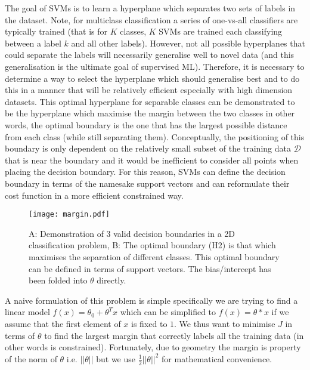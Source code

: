 The goal of SVMs is to learn a hyperplane which separates two sets of labels in the dataset. Note, for multiclass classification a series of one-vs-all
classifiers are typically trained (that is for \(K\) classes, \(K\) SVMs are trained each classifying between a label \(k\) and all other labels).
However, not all possible hyperplanes that could separate the labels will necessarily generalise well to novel data (and this generalisation
is the ultimate goal of supervised ML).  Therefore, it is necessary to determine a way to select the hyperplane which should generalise best and to do
this in a manner that will be relatively efficient especially with high dimension datasets.  This optimal hyperplane for separable classes can be demonstrated to be
the hyperplane which maximise the margin between the two classes \citep{vapnik1982estimation} in other words, the optimal boundary is the one that has the largest
possible distance from each class (while still separating them).  Conceptually, the positioning of this boundary is only dependent
on the relatively small subset of the training data \(\mathcal{D}\) that is near the boundary and it would be inefficient to consider all points when
placing the decision boundary.  For this reason, SVMs can define the decision boundary in terms of the namesake support vectors and can reformulate
their cost function in a more efficient constrained way.

\begin{figure}[h]
    \texttt{[image: margin.pdf]}
    \caption{A: Demonstration of 3 valid decision boundaries in a 2D classification problem, B: The optimal boundary (H2) is that which maximises
        the separation of different classes.  This optimal boundary can be defined in terms of support vectors.  The bias/intercept has been 
    folded into \(\theta\) directly.}
    \label{fig:margin}
\end{figure}

A naive formulation of this problem is simple specifically we are trying to find a linear model \(f(x) = \theta_{0} + \theta^{T}x\) which can be simplified 
to \(f(x) = \theta * x \) if we assume that the first element of \(x\) is fixed to \(1\). We thus want to minimise \(J\) in terms of \(\theta\) to find
the largest margin that correctly labels all the training data (in other words is constrained).  Fortunately, due to geometry the margin is property of
the norm of \(\theta\) i.e. \(||\theta||\) but we use \(\frac{1}{2} ||\theta||^{2}\) for mathematical convenience.

